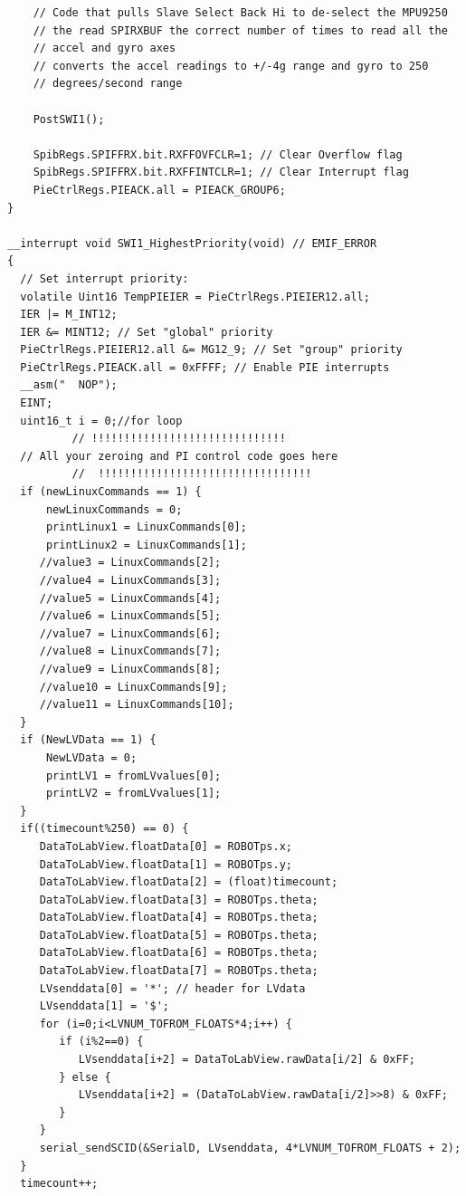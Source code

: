 \documentclass[11pt]{article}
\begin{document}
\begin{enumerate}
\begin{verbatim}
    // Code that pulls Slave Select Back Hi to de-select the MPU9250
    // the read SPIRXBUF the correct number of times to read all the
    // accel and gyro axes
    // converts the accel readings to +/-4g range and gyro to 250
    // degrees/second range

    PostSWI1();

    SpibRegs.SPIFFRX.bit.RXFFOVFCLR=1; // Clear Overflow flag
    SpibRegs.SPIFFRX.bit.RXFFINTCLR=1; // Clear Interrupt flag
    PieCtrlRegs.PIEACK.all = PIEACK_GROUP6;
}

__interrupt void SWI1_HighestPriority(void) // EMIF_ERROR
{
  // Set interrupt priority:
  volatile Uint16 TempPIEIER = PieCtrlRegs.PIEIER12.all;
  IER |= M_INT12;
  IER &= MINT12; // Set "global" priority
  PieCtrlRegs.PIEIER12.all &= MG12_9; // Set "group" priority
  PieCtrlRegs.PIEACK.all = 0xFFFF; // Enable PIE interrupts
  __asm("  NOP");
  EINT;
  uint16_t i = 0;//for loop
          // !!!!!!!!!!!!!!!!!!!!!!!!!!!!!!
  // All your zeroing and PI control code goes here
          //  !!!!!!!!!!!!!!!!!!!!!!!!!!!!!!!!!
  if (newLinuxCommands == 1) {
      newLinuxCommands = 0;
      printLinux1 = LinuxCommands[0];
      printLinux2 = LinuxCommands[1];
     //value3 = LinuxCommands[2];
     //value4 = LinuxCommands[3];
     //value5 = LinuxCommands[4];
     //value6 = LinuxCommands[5];
     //value7 = LinuxCommands[6];
     //value8 = LinuxCommands[7];
     //value9 = LinuxCommands[8];
     //value10 = LinuxCommands[9];
     //value11 = LinuxCommands[10];
  }
  if (NewLVData == 1) {
      NewLVData = 0;
      printLV1 = fromLVvalues[0];
      printLV2 = fromLVvalues[1];
  }
  if((timecount%250) == 0) {
     DataToLabView.floatData[0] = ROBOTps.x;
     DataToLabView.floatData[1] = ROBOTps.y;
     DataToLabView.floatData[2] = (float)timecount;
     DataToLabView.floatData[3] = ROBOTps.theta;
     DataToLabView.floatData[4] = ROBOTps.theta;
     DataToLabView.floatData[5] = ROBOTps.theta;
     DataToLabView.floatData[6] = ROBOTps.theta;
     DataToLabView.floatData[7] = ROBOTps.theta;
     LVsenddata[0] = '*'; // header for LVdata
     LVsenddata[1] = '$';
     for (i=0;i<LVNUM_TOFROM_FLOATS*4;i++) {
        if (i%2==0) {
           LVsenddata[i+2] = DataToLabView.rawData[i/2] & 0xFF;
        } else {
           LVsenddata[i+2] = (DataToLabView.rawData[i/2]>>8) & 0xFF;
        }
     }
     serial_sendSCID(&SerialD, LVsenddata, 4*LVNUM_TOFROM_FLOATS + 2);
  }
  timecount++;


\end{verbatim}
\end{enumerate}
\end{document}
